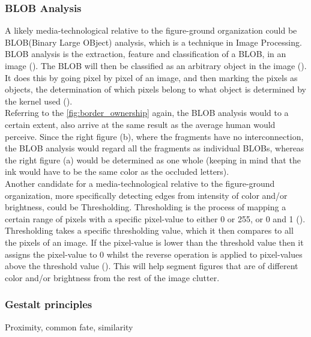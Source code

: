 \documentclass{article}
\newcommand{\goodcite}[1]{ {(\cite{#1})}}
\begin{document}

\subsubsection{BLOB Analysis}
A likely media-technological relative to the figure-ground organization could be BLOB(Binary Large OBject) analysis, which is a technique in Image Processing. BLOB analysis is the extraction, feature and classification of a BLOB, in an image\goodcite{IP}. The BLOB will then be classified as an arbitrary object in the image\goodcite{IP}.\\It does this by going pixel by pixel of an image, and then marking the pixels as objects, the determination of which pixels belong to what object is determined by the kernel used\goodcite{IP}.\medskip \\

Referring to the \autoref{fig:border_ownership} again, the BLOB analysis would to a certain extent, also arrive at the same result as the average human would perceive. Since the right figure (b), where the fragments have no interconnection, the BLOB analysis would regard all the fragments as individual BLOBs, whereas the right figure (a) would be determined as one whole (keeping in mind that the ink would have to be the same color as the occluded letters).\\Another candidate for a media-technological relative to the figure-ground organization, more specifically detecting edges from intensity of color and/or brightness, could be Thresholding. Thresholding is the process of mapping a certain range of pixels with a specific pixel-value to either 0 or 255, or 0 and 1\goodcite{IP}. Thresholding takes a specific thresholding value, which it then compares to all the pixels of an image. If the pixel-value is lower than the threshold value then it assigns the pixel-value to 0 whilst the reverse operation is applied to pixel-values above the threshold value\goodcite{IP}. This will help segment figures that are of different color and/or brightness from the rest of the image clutter.


\subsubsection{Gestalt principles}
Proximity, common fate, similarity
\end{document}
